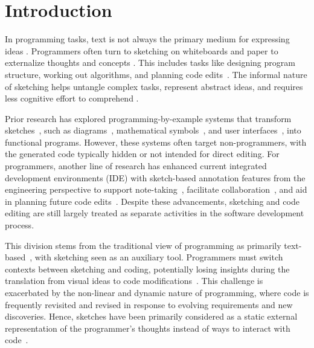 \section{Introduction}
In programming tasks, text is not always the primary medium for expressing ideas \cite{latoza_maintaining_2006}. Programmers often turn to sketching on whiteboards and paper to externalize thoughts and concepts \cite{cherubini_lets_2007, 6922572, 6065018}. This includes tasks like designing program structure, working out algorithms, and planning code edits~\cite{cherubini_lets_2007, 10.1145/1879211.1879217, sutherland_investigation_2017}.
The informal nature of sketching helps untangle complex tasks, represent abstract ideas, and requires less cognitive effort to comprehend \cite{cherubini_lets_2007, tversky2002sketches, goel1995sketches}.


Prior research has explored programming-by-example systems that transform sketches~\cite{10.1145/22627.22349}, such as diagrams~\cite{10.1145/1281500.1281546}, mathematical symbols~\cite{li2008algosketch, 10.1145/3411764.3445460}, and user interfaces~\cite{tldraw, 910894, microsoft_sketch2code}, into functional programs.
However, these systems often target non-programmers, with the generated code typically hidden or not intended for direct editing.
For programmers, another line of research has enhanced current integrated development environments (IDE) with sketch-based annotation features from the engineering perspective to support note-taking~\cite{sutherland2015observational, 10.1145/1324892.1324935}, facilitate collaboration~\cite{lichtschlag2014codegraffiti}, and aid in planning future code edits~\cite{samuelsson2020eliciting}.
Despite these advancements, sketching and code editing are still largely treated as separate activities in the software development process.

This division stems from the traditional view of programming as primarily text-based~\cite{arawjo_write_2020}, with sketching seen as an auxiliary tool.
Programmers must switch contexts between sketching and coding, potentially losing insights during the translation from visual ideas to code modifications~\cite{parnin2006building, 10.1145/1879211.1879217, bff9b250-7640-39e2-8f34-329fd1552822}. This challenge is exacerbated by the non-linear and dynamic nature of programming, where code is frequently revisited and revised in response to evolving requirements and new discoveries.
Hence, sketches have been primarily considered as a static external representation of the programmer's thoughts instead of ways to interact with code~\cite{sutherland2015observational, 10.1145/1324892.1324935, 1698771}. 



